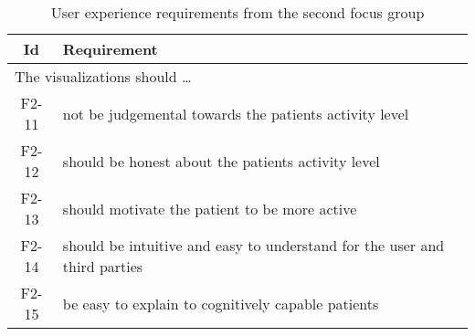 \begin{table}[h!]
  \begin{center}
  \begin{tabular}{|c|p{12cm}|}
    \hline
      \textbf{Id} & \textbf{Requirement} \\ \hline
    \multicolumn{2}{|l|}{The visualizations should \ldots} \\ \hline
      F2-11 & not be judgemental towards the patients activity level \\ \hline
      F2-12 & should be honest about the patients activity level \\ \hline
      F2-13 & should motivate the patient to be more active \\ \hline
      F2-14 & should be intuitive and easy to understand for the user and third parties \\ \hline
      F2-15 & be easy to explain to cognitively capable patients \\ \hline
      
  \end{tabular}
  \end{center}
  \caption{User experience requirements from the second focus group}
  \label{f2ReqUx}
\end{table}



